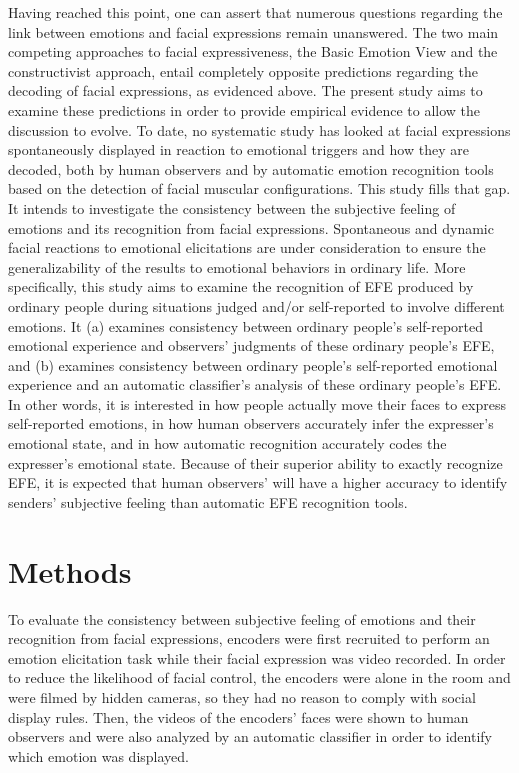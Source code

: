 \documentclass[
  english,
  doc]{apa7}
\begin{document}
Having reached this point, one can assert that numerous questions regarding the link between emotions and facial expressions remain unanswered. The two main competing approaches to facial expressiveness, the Basic Emotion View and the constructivist approach, entail completely opposite predictions regarding the decoding of facial expressions, as evidenced above. The present study aims to examine these predictions in order to provide empirical evidence to allow the discussion to evolve. To date, no systematic study has looked at facial expressions spontaneously displayed in reaction to emotional triggers and how they are decoded, both by human observers and by automatic emotion recognition tools based on the detection of facial muscular configurations. This study fills that gap. It intends to investigate the consistency between the subjective feeling of emotions and its recognition from facial expressions. Spontaneous and dynamic facial reactions to emotional elicitations are under consideration to ensure the generalizability of the results to emotional behaviors in ordinary life. More specifically, this study aims to examine the recognition of EFE produced by ordinary people during situations judged and/or self-reported to involve different emotions. It (a) examines consistency between ordinary people's self-reported emotional experience and observers' judgments of these ordinary people's EFE, and (b) examines consistency between ordinary people's self-reported emotional experience and an automatic classifier's analysis of these ordinary people's EFE. In other words, it is interested in how people actually move their faces to express self-reported emotions, in how human observers accurately infer the expresser's emotional state, and in how automatic recognition accurately codes the expresser's emotional state. Because of their superior ability to exactly recognize EFE, it is expected that human observers' will have a higher accuracy to identify senders' subjective feeling than automatic EFE recognition tools.

\hypertarget{methods}{%
\section{Methods}\label{methods}}

To evaluate the consistency between subjective feeling of emotions and their recognition from facial expressions, encoders were first recruited to perform an emotion elicitation task while their facial expression was video recorded. In order to reduce the likelihood of facial control, the encoders were alone in the room and were filmed by hidden cameras, so they had no reason to comply with social display rules. Then, the videos of the encoders' faces were shown to human observers and were also analyzed by an automatic classifier in order to identify which emotion was displayed.
\end{document}
